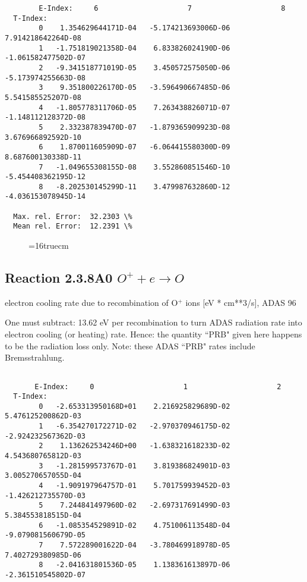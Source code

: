 \documentclass[12pt,dvipdfmx]{article}
\begin{document}
{\begin{small}
\begin{verbatim}
        E-Index:     6                     7                     8
  T-Index:
        0    1.354629644171D-04   -5.174213693006D-06    7.914218642264D-08
        1   -1.751819021358D-04    6.833826024190D-06   -1.061582477502D-07
        2   -9.341518771019D-05    3.450572575050D-06   -5.173974255663D-08
        3    9.351800226170D-05   -3.596490667485D-06    5.541585525207D-08
        4   -1.805778311706D-05    7.263438826071D-07   -1.148112128372D-08
        5    2.332387839470D-07   -1.879365909923D-08    3.676966892592D-10
        6    1.870011605909D-07   -6.064415580300D-09    8.687600130338D-11
        7   -1.049655308155D-08    3.552860851546D-10   -5.454408362195D-12
        8   -8.202530145299D-11    3.479987632860D-12   -4.036153078945D-14

  Max. rel. Error:  32.2303 \%
  Mean rel. Error:  12.2391 \%

\end{verbatim}\end{small}
\begin{figure} \label{2.3.7rl}
\epsfxsize=16truecm 
\end{figure}
\newpage

\subsection{
  Reaction 2.3.8A0  $O^+ + e \rightarrow O   $
}
electron cooling rate due to recombination of O$^+$ ions [eV *
cm**3/s], ADAS 96

One must subtract: 13.62 eV per recombination to turn ADAS radiation
rate into electron cooling (or heating) rate. Hence: the quantity
``PRB" given here happens to be the radiation loss only. Note: these
ADAS ``PRB" rates include Bremsstrahlung.

\begin{small}\begin{verbatim}

       E-Index:     0                     1                     2
  T-Index:
        0   -2.653313950168D+01    2.216925829689D-02    5.476125200862D-03
        1   -6.354270172271D-02   -2.970370946175D-02   -2.924232567362D-03
        2    1.136262534246D+00   -1.638321618233D-02    4.543680765812D-03
        3   -1.281599573767D-01    3.819386824901D-03    3.005270657055D-04
        4   -1.909197964757D-01    5.701759939452D-03   -1.426212735570D-03
        5    7.244841497960D-02   -2.697317691499D-03    5.384553818515D-04
        6   -1.085354529891D-02    4.751006113548D-04   -9.079081560679D-05
        7    7.572289001622D-04   -3.780469918978D-05    7.402729380985D-06
        8   -2.041631801536D-05    1.138361613897D-06   -2.361510545802D-07


\end{verbatim}
\end{small}}
\end{document}
